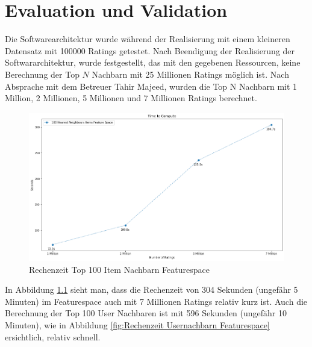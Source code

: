 \chapter{Evaluation und Validation}
\label{ch:Eval}

Die  Softwarearchitektur wurde während der Realisierung mit einem kleineren Datensatz mit 100000 Ratings getestet. Nach Beendigung der Realisierung der Softwararchitektur, wurde festgestellt, das mit den gegebenen Ressourcen, keine Berechnung der Top $N$ Nachbarn mit 25 Millionen Ratings möglich ist.
Nach Absprache mit dem Betreuer Tahir Majeed, wurden die Top N Nachbarn mit 1 Million, 2 Millionen, 5 Millionen und 7 Millionen Ratings berechnet.

\begin{figure}[htb]
	\centering
	\includegraphics[keepaspectratio,width=\linewidth]{img/Time to Compute Items Featurespace.png}
	\caption{Rechenzeit Top 100 Item Nachbarn Featurespace}
	\label{fig:Rechenzeit Itemnachbarn Featurespace}
\end{figure}

In Abbildung \ref{fig:Rechenzeit Itemnachbarn Featurespace} sieht man, dass die Rechenzeit von 304 Sekunden (ungefähr 5 Minuten) im Featurespace auch mit 7 Millionen Ratings relativ kurz ist. Auch die Berechnung der Top 100 User Nachbaren ist mit 596 Sekunden (ungefähr 10 Minuten), wie in Abbildung \ref{fig:Rechenzeit Usernachbarn Featurespace} ersichtlich, relativ schnell. 

